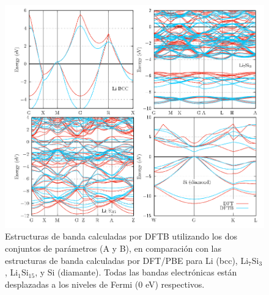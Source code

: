 \begin{figure}[th]
    \centering
    \includegraphics[width=\textwidth]{Silicio/modelo/resultados/bandas/bandas.png}
    \caption{Estructuras de banda calculadas por DFTB utilizando los dos conjuntos
    de parámetros (A y B), en comparación con las estructuras de banda calculadas 
    por DFT/PBE para Li (bcc), Li$_7$Si$_3$, Li$_1$Si$_{15}$, y Si (diamante). 
    Todas las bandas electrónicas están desplazadas a los niveles de Fermi (0 eV)
    respectivos.}
    \label{fig:bandas}
\end{figure}

